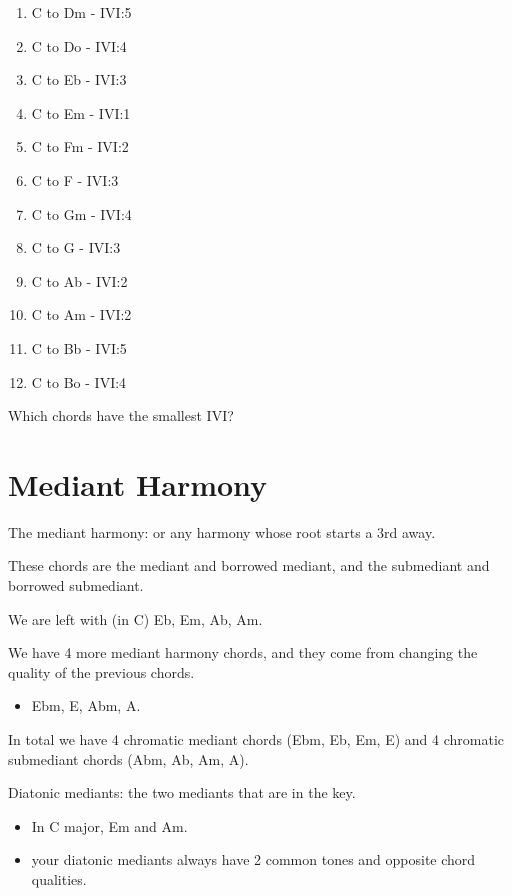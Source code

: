 \documentclass{book}
\providecommand{\tightlist}{%
  \setlength{\itemsep}{0pt}\setlength{\parskip}{0pt}}
\begin{document}
\begin{enumerate}
\def\labelenumi{\arabic{enumi}.}
\item
  C to Dm - IVI:5
\item
  C to Do - IVI:4
\item
  C to Eb - IVI:3
\item
  C to Em - IVI:1
\item
  C to Fm - IVI:2
\item
  C to F - IVI:3
\item
  C to Gm - IVI:4
\item
  C to G - IVI:3
\item
  C to Ab - IVI:2
\item
  C to Am - IVI:2
\item
  C to Bb - IVI:5
\item
  C to Bo - IVI:4
\end{enumerate}

Which chords have the smallest IVI?

\hypertarget{mediant-harmony-1}{%
\section{Mediant Harmony}\label{mediant-harmony-1}}

The mediant harmony: or any harmony whose root starts a 3rd away.

These chords are the mediant and borrowed mediant, and the submediant and
borrowed submediant.

We are left with (in C) Eb, Em, Ab, Am.

We have 4 more mediant harmony chords, and they come from changing the quality
of the previous chords.

\begin{itemize}
\tightlist
\item
  Ebm, E, Abm, A.
\end{itemize}

In total we have 4 chromatic mediant chords (Ebm, Eb, Em, E) and 4 chromatic
submediant chords (Abm, Ab, Am, A).

Diatonic mediants: the two mediants that are in the key.

\begin{itemize}
\item
  In C major, Em and Am.
\item
  your diatonic mediants always have 2 common tones and opposite chord
  qualities.
\end{itemize}
\end{document}
